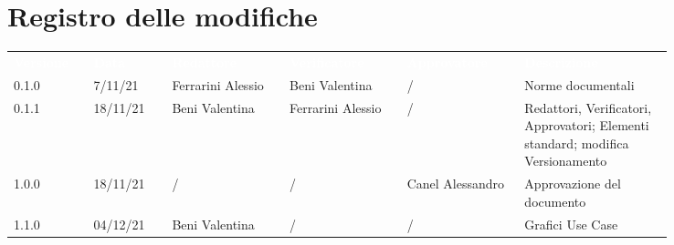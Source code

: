 \section*{Registro delle modifiche}

{\renewcommand{\arraystretch}{1.5}
\scriptsize
\begin{tabular}{p{0.10\linewidth}p{0.10\linewidth}p{0.15\linewidth}p{0.15\linewidth}p{0.15\linewidth}p{0.19\linewidth}}
	\rowcolor[RGB]{33, 73, 50}
	\textcolor{white}{\textbf{Versione}} & \textcolor{white}{\textbf{Data}} & \textcolor{white}
	{\textbf{Redattore}} & \textcolor{white}{\textbf{Verificatore}} & \textcolor{white}{\textbf{Approvatore}} & \textcolor{white}
	{\textbf{Descrizione}}\\
	\rowcolor[RGB]{216, 235, 171}
	0.1.0 & 7/11/21 & Ferrarini Alessio & Beni Valentina & / & Norme documentali\\
	\rowcolor[RGB]{233, 245, 206}
	0.1.1 & 18/11/21 & Beni Valentina & Ferrarini Alessio & / & Redattori, Verificatori, Approvatori; Elementi standard; modifica Versionamento\\
	\rowcolor[RGB]{216, 235, 171}
	1.0.0 & 18/11/21 & / & / & Canel Alessandro & Approvazione del documento \\
	\rowcolor[RGB]{233, 245, 206}
	1.1.0 & 04/12/21 & Beni Valentina & / & / & Grafici Use Case \\
\end{tabular}	
}